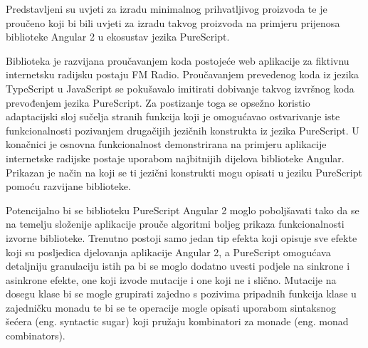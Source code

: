 \documentclass[times, utf8, zavrsni]{fer}
\begin{document}
Predstavljeni su uvjeti za izradu minimalnog prihvatljivog proizvoda te je proučeno koji bi bili uvjeti za izradu takvog proizvoda na primjeru prijenosa biblioteke Angular 2 u ekosustav jezika PureScript.

Biblioteka je razvijana proučavanjem koda postojeće web aplikacije za fiktivnu internetsku radijsku postaju FM Radio. Proučavanjem prevedenog koda iz jezika TypeScript u JavaScript se pokušavalo imitirati dobivanje takvog izvršnog koda prevođenjem jezika PureScript. Za postizanje toga se opsežno koristio adaptacijski sloj sučelja stranih funkcija koji je omogućavao ostvarivanje iste funkcionalnosti pozivanjem drugačijih jezičnih konstrukta iz jezika PureScript. U konačnici je osnovna funkcionalnost demonstrirana na primjeru aplikacije internetske radijske postaje uporabom najbitnijih dijelova biblioteke Angular. Prikazan je način na koji se ti jezični konstrukti mogu opisati u jeziku PureScript pomoću razvijane biblioteke.

Potencijalno bi se biblioteku PureScript Angular 2 moglo poboljšavati tako da se na temelju složenije aplikacije prouče algoritmi boljeg prikaza funkcionalnosti izvorne biblioteke. Trenutno postoji samo jedan tip efekta koji opisuje sve efekte koji su posljedica djelovanja aplikacije Angular 2, a PureScript omogućava detaljniju granulaciju istih pa bi se moglo dodatno uvesti podjele na sinkrone i asinkrone efekte, one koji izvode mutacije i one koji ne i slično. Mutacije na dosegu klase bi se mogle grupirati zajedno s pozivima pripadnih funkcija klase u zajedničku monadu te bi se te operacije mogle opisati uporabom sintaksnog šećera (eng. syntactic sugar) koji pružaju kombinatori za monade (eng. monad combinators).



\end{document}
